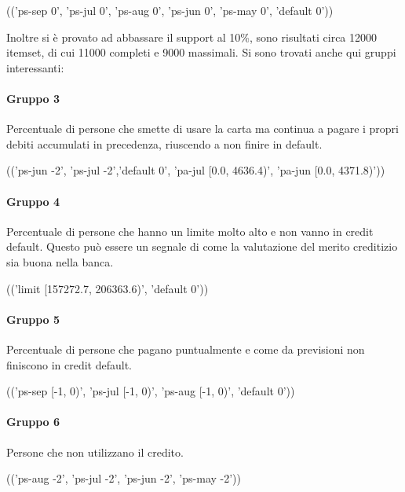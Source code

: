 \begin{center}
	(('ps-sep 0', 'ps-jul 0', 'ps-aug 0', 'ps-jun 0', 'ps-may 0', 'default 0'))
\end{center}

Inoltre si \`e provato ad abbassare il support al 10\%, sono risultati circa
12000 itemset, di cui 11000 completi e 9000 massimali. Si sono trovati
anche qui gruppi interessanti:

\paragraph{Gruppo 3}
Percentuale di persone che smette di usare la carta ma continua a pagare i propri
debiti accumulati in precedenza, riuscendo a non finire in default.

\begin{center}
	(('ps-jun -2', 'ps-jul -2','default 0', 'pa-jul [0.0, 4636.4)', 'pa-jun [0.0, 4371.8)'))
\end{center}

\paragraph{Gruppo 4}
Percentuale di persone che hanno un limite molto alto e non vanno in credit default.
Questo pu\`o essere un segnale di come la valutazione del merito creditizio
sia buona nella banca.

\begin{center}
	(('limit [157272.7, 206363.6)', 'default 0'))
\end{center}

\paragraph{Gruppo 5}
Percentuale di persone che pagano puntualmente e come da previsioni non finiscono
in credit default.

\begin{center}
	(('ps-sep [-1, 0)', 'ps-jul [-1, 0)', 'ps-aug [-1, 0)', 'default 0'))
\end{center}

\paragraph{Gruppo 6}
Persone che non utilizzano il credito.

\begin{center}
	(('ps-aug -2', 'ps-jul -2', 'ps-jun -2', 'ps-may -2'))
\end{center}

